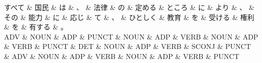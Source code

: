 \documentclass[tikz,border=5pt]{standalone}
\begin{document}
\normalsize
\begin{dependency}[edge unit distance=10.9pt]
    \begin{deptext}[column sep=1em]
        すべて \& 国民 \& は \& 、 \& 法律 \& の \& 定める \& ところ \& に \& より \& 、 \& その \& 能力 \& に \& 応じ \& て \& 、 \& ひとしく \& 教育 \& を \& 受ける \& 権利 \& を \& 有する \& 。\\
        ADV \& NOUN \& ADP \& PUNCT \& NOUN \& ADP \& VERB \& NOUN \& ADP \& VERB \& PUNCT \& DET \& NOUN \& ADP \& VERB \& SCONJ \& PUNCT \& ADV \& NOUN \& ADP \& VERB \& NOUN \& ADP \& VERB \& PUNCT\\
    \end{deptext}
\end{dependency}
\end{document}
